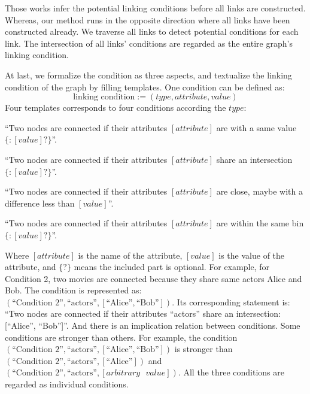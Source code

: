 Those works infer the potential linking conditions before all links are constructed. 
Whereas, our method runs in the opposite direction where all links have been constructed already.
We traverse all links to detect potential conditions for each link.
The intersection of all links' conditions are regarded as the entire graph's linking condition.

At last, we formalize the condition as three aspects, and textualize the linking condition of the graph by filling templates. 
One condition can be defined as:
\begin{equation}
    \text{linking condition} := ( type, attribute, value )
\end{equation}
Four templates corresponds to four conditions according the $type$:

\begin{compactenum}
    \item ``Two nodes are connected if their attributes $[{attribute}]$ are with a same value$\{: [{value}]?\}$''.
    \item ``Two nodes are connected if their attributes $[{attribute}]$ share an intersection$\{: [{value}]?\}$''.
    \item ``Two nodes are connected if their attributes $[{attribute}]$ are close, maybe with a difference less than $[{value}]$''.
    \item ``Two nodes are connected if their attributes $[{attribute}]$ are within the same bin$\{: [{value}]?\}$''.
\end{compactenum}

Where $[{attribute}]$ is the name of the attribute, $[{value}]$ is the value of the attribute, and $\{?\}$ means the included part is optional. 
For example, for Condition 2, two movies are connected because they share same actors Alice and Bob. 
The condition is represented as: $(\text{``Condition 2''}, \text{``actors''}, [\text{``Alice''}, \text{``Bob''}])$. 
Its corresponding statement is: ``Two nodes are connected if their attributes ``actors'' share an intersection: [``Alice'', ``Bob'']''. 
And there is an implication relation between conditions.
Some conditions are stronger than others.
For example, the condition $(\text{``Condition 2''}, \text{``actors''}, [\text{``Alice''}, \text{``Bob''}])$ is stronger than $(\text{``Condition 2''}, \text{``actors''}, [\text{``Alice''}])$ and $(\text{``Condition 2''}, \text{``actors''}, [arbitrary\text{ }value])$.
All the three conditions are regarded as individual conditions.

